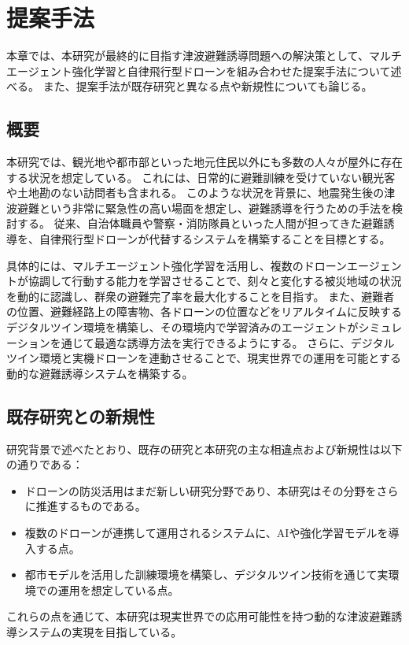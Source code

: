 \chapter{提案手法}  
本章では、本研究が最終的に目指す津波避難誘導問題への解決策として、マルチエージェント強化学習と自律飛行型ドローンを組み合わせた提案手法について述べる。
また、提案手法が既存研究と異なる点や新規性についても論じる。

\section{概要}  
本研究では、観光地や都市部といった地元住民以外にも多数の人々が屋外に存在する状況を想定している。
これには、日常的に避難訓練を受けていない観光客や土地勘のない訪問者も含まれる。
このような状況を背景に、地震発生後の津波避難という非常に緊急性の高い場面を想定し、避難誘導を行うための手法を検討する。
従来、自治体職員や警察・消防隊員といった人間が担ってきた避難誘導を、自律飛行型ドローンが代替するシステムを構築することを目標とする。

具体的には、マルチエージェント強化学習を活用し、複数のドローンエージェントが協調して行動する能力を学習させることで、刻々と変化する被災地域の状況を動的に認識し、群衆の避難完了率を最大化することを目指す。
また、避難者の位置、避難経路上の障害物、各ドローンの位置などをリアルタイムに反映するデジタルツイン環境を構築し、その環境内で学習済みのエージェントがシミュレーションを通じて最適な誘導方法を実行できるようにする。
さらに、デジタルツイン環境と実機ドローンを連動させることで、現実世界での運用を可能とする動的な避難誘導システムを構築する。


\section{既存研究との新規性}  
研究背景で述べたとおり、既存の研究と本研究の主な相違点および新規性は以下の通りである：
\begin{itemize}
    \item ドローンの防災活用はまだ新しい研究分野であり、本研究はその分野をさらに推進するものである。
    \item 複数のドローンが連携して運用されるシステムに、AIや強化学習モデルを導入する点。
    \item 都市モデルを活用した訓練環境を構築し、デジタルツイン技術を通じて実環境での運用を想定している点。
\end{itemize}

これらの点を通じて、本研究は現実世界での応用可能性を持つ動的な津波避難誘導システムの実現を目指している。

